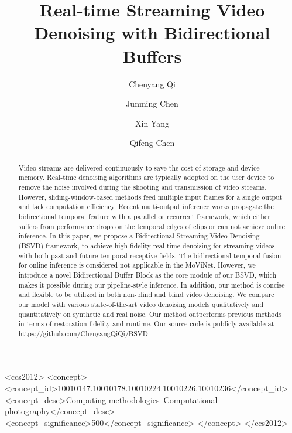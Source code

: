 \documentclass[sigconf]{acmart}
\begin{document}
\title{Real-time Streaming Video Denoising with Bidirectional Buffers}


\author{Chenyang Qi}
\authornotemark[1]


\author{Junming Chen}


\author{Xin Yang}


\author{Qifeng Chen}




\begin{abstract}




Video streams are delivered continuously to save the cost of storage and device memory. 
Real-time denoising algorithms are typically adopted on the user device to remove the noise involved during the shooting and transmission of video streams.
However, sliding-window-based methods feed multiple input frames for a single output and lack computation efficiency. Recent multi-output inference works propagate the bidirectional temporal feature with a parallel or recurrent framework, which either suffers from performance drops on the temporal edges of clips or can not achieve online inference.
In this paper, we propose a Bidirectional Streaming Video Denoising (BSVD) framework, to achieve high-fidelity real-time denoising for streaming videos with both past and future temporal receptive fields.
The bidirectional temporal fusion for online inference is considered not applicable in the MoViNet. However, we introduce a novel Bidirectional Buffer Block as the core module of our BSVD, which makes it possible during our pipeline-style inference.
In addition, our method is concise and flexible to be utilized in both non-blind and blind video denoising. We compare our model with various state-of-the-art video denoising models qualitatively and quantitatively on synthetic and real noise. Our method outperforms previous methods in terms of restoration fidelity and runtime. Our source code is publicly available at \url{https://github.com/ChenyangQiQi/BSVD}


\end{abstract}





\begin{CCSXML}
<ccs2012>
   <concept>
       <concept_id>10010147.10010178.10010224.10010226.10010236</concept_id>
       <concept_desc>Computing methodologies~Computational photography</concept_desc>
       <concept_significance>500</concept_significance>
       </concept>
 </ccs2012>
\end{CCSXML}
\end{document}
